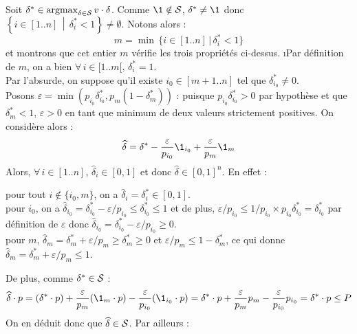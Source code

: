			\eqskip{2mm}
			\begin{Preuve}
				Soit \( \delta^* \in \argmax_{\delta \in \cal{S}} v \dotp \delta \). Comme $\1 \notin \cal{S}$, $\delta^* \neq \1$ donc \( \left\{ i \in [1..n] \, \middle| \, \delta^*_i < 1 \right\} \neq \emptyset \). Notons alors :
				\[m = \min \, \{ i \in [1..n] \, | \, \delta^*_i < 1 \}\]
				et montrons que cet entier \(m\) vérifie les trois propriétés ci-dessus. \nt
				\i Par définition de $m$, on a bien \( \forall \, i \in [1..m[, \, \delta^*_i = 1 \). \\[3mm] \eqskip{3mm}
				\ii Par l'absurde, on suppose qu'il existe \( i_0 \in [m+1..n] \) tel que \( \delta^*_{i_0} \neq 0 \). \\
				Posons \(\varepsilon = \min \left(p_{i_0}\delta^*_{i_0}, p_m(1-\delta^*_m)\right)\) : puisque \(p_{i_0}\delta^*_{i_0} > 0\) par hypothèse et que \(\delta^*_m < 1\), \(\varepsilon > 0\) en tant que minimum de deux valeurs strictement positives.	On considère alors :
					\[
						\widehat{\delta} = \delta^* - \displaystyle \frac{\varepsilon}{p_{i_0}} \1_{i_0} + \frac{\varepsilon}{p_m} \1_{m}
					\]
				Alors, \(\forall\,i\in [1..n]\), \(\widehat{\delta}_i \in [0,1]\) et donc \(\widehat{\delta} \in [0,1]^n\). En effet : 
					\begin{addmargin}{5mm}
						\bdot pour tout \( i \notin \{ i_0, m \} \), on a \( \widehat{\delta}_i = \delta^*_i \in [0, 1] \). \\
						\bdot pour \(i_0\), on a \( \widehat{\delta}_{i_0} = \delta^*_{i_0} - \varepsilon/p_{i_0} \leq \delta^*_{i_0} \leq 1 \) et de plus, \( \varepsilon/p_{i_0} \leq {1}/{p_{i_0}} \times p_{i_0} \delta^*_{i_0} = \delta^*_{i_0}\) par \\ \listspace définition de \(\varepsilon\) donc \( \widehat{\delta}_{i_0} = \delta^*_{i_0} - {\varepsilon}/{p_{i_0}} \geq 0 \). \\
						\bdot pour \(m\), \( \widehat{\delta}_m = \delta^*_m + {\varepsilon}/{p_m} \geq \delta^*_m \geq 0 \) et \( {\varepsilon}/{p_m} \leq 1 - \delta^*_m \), ce qui donne \( \widehat{\delta}_m = \delta^*_m + {\varepsilon}/{p_m} \leq 1 \).
					\end{addmargin}
				\eqskip{2mm}
				De plus, comme $\delta^* \in \cal{S}$ :
					\[ \widehat{\delta} \dotp p = \displaystyle (\delta^* \dotp p ) + \frac{\varepsilon}{p_m} {(\1_m \dotp p)} - \frac{\varepsilon}{p_{i_0}}(\1_{i_0} \dotp p) = \delta^* \dotp p + \frac{\varepsilon}{p_m}p_m - \frac{\varepsilon}{p_{i_0}}p_{i_0} = \delta^* \dotp p \leq P\]
				On en déduit donc que \(\widehat{\delta} \in \cal{S}\). Par ailleurs :

\end{Preuve}
